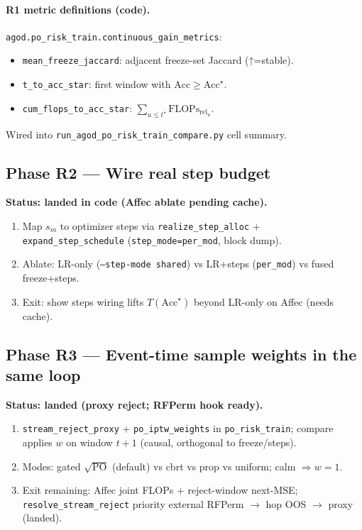 \documentclass[11pt]{article}
\newcommand{\PO}{\mathrm{PO}}
\newcommand{\Flops}{\mathrm{FLOPs}_{\mathrm{rel}}}
\newcommand{\Acc}{\mathrm{Acc}}
\begin{document}
\paragraph{R1 metric definitions (code).}
\texttt{agod.po\_risk\_train.continuous\_gain\_metrics}:
\begin{itemize}[leftmargin=1.2em,itemsep=1pt]
  \item \texttt{mean\_freeze\_jaccard}: adjacent freeze-set Jaccard (↑=stable).
  \item \texttt{t\_to\_acc\_star}: first window with $\Acc\ge\Acc^\star$.
  \item \texttt{cum\_flops\_to\_acc\_star}: $\sum_{u\le t^\star}\Flops_u$.
\end{itemize}
Wired into \texttt{run\_agod\_po\_risk\_train\_compare.py} cell summary.

\subsection{Phase R2 --- Wire real step budget}
\textbf{Status: landed in code (Affec ablate pending cache).}
\begin{enumerate}[leftmargin=1.2em,itemsep=1pt]
  \item Map $s_m$ to optimizer steps via
        \texttt{realize\_step\_alloc} + \texttt{expand\_step\_schedule}
        (\texttt{step\_mode=per\_mod}, block dump).
  \item Ablate: LR-only (\texttt{--step-mode shared}) vs LR+steps
        (\texttt{per\_mod}) vs fused freeze+steps.
  \item Exit: show steps wiring lifts $T(\Acc^\star)$ beyond LR-only
        on Affec (needs cache).
\end{enumerate}

\subsection{Phase R3 --- Event-time sample weights in the same loop}
\textbf{Status: landed (proxy reject; RFPerm hook ready).}
\begin{enumerate}[leftmargin=1.2em,itemsep=1pt]
  \item \texttt{stream\_reject\_proxy} + \texttt{po\_iptw\_weights} in
        \texttt{po\_risk\_train}; compare applies $w$ on window $t{+}1$
        (causal, orthogonal to freeze/steps).
  \item Modes: gated $\sqrt{\PO}$ (default) vs cbrt vs prop vs uniform;
        calm $\Rightarrow w=1$.
  \item Exit remaining: Affec joint FLOPs + reject-window next-MSE;
        \texttt{resolve\_stream\_reject} priority
        external RFPerm $\to$ hop OOS $\to$ proxy (landed).
\end{enumerate}
\end{document}
